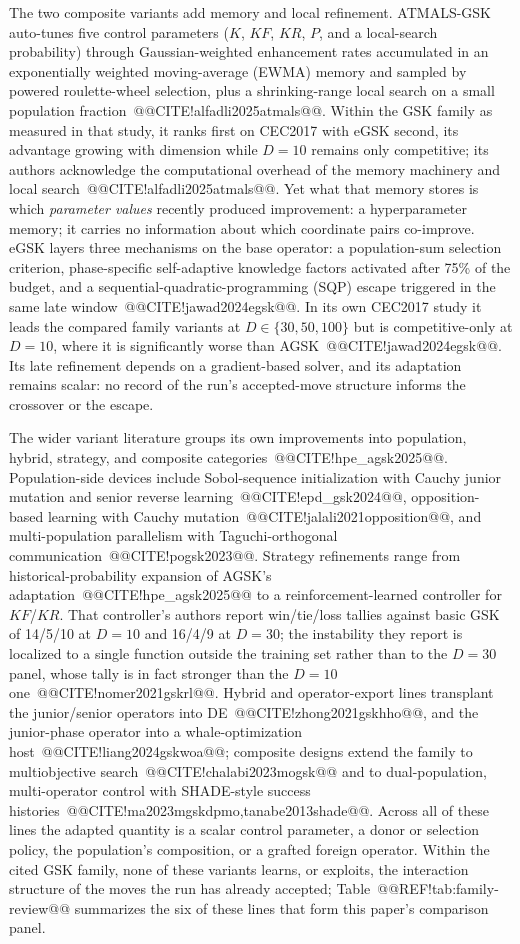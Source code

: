 \documentclass[10pt,a4paper]{article}
\newcommand{\atmals}{ATMALS-GSK}
\newcommand{\agsk}{AGSK}
\newcommand{\egsk}{eGSK}
\begin{document}
The two composite variants add memory and local refinement. \atmals{}
auto-tunes five control parameters ($K$, $KF$, $KR$, $P$, and a
local-search probability) through Gaussian-weighted enhancement rates
accumulated in an exponentially weighted moving-average (EWMA) memory and
sampled by powered roulette-wheel selection, plus a shrinking-range
local search on a small population
fraction~@@CITE!alfadli2025atmals@@. 
Within the GSK family as measured in that study, it ranks first on
CEC2017 with \egsk{} second, its advantage growing with dimension while
$D = 10$ remains only competitive; its authors acknowledge the
computational overhead of the memory machinery and local
search~@@CITE!alfadli2025atmals@@. 
Yet what that memory stores is which \emph{parameter values} recently
produced improvement: a hyperparameter memory; it carries no
information about which coordinate pairs co-improve. \egsk{} layers
three mechanisms on the base operator: a population-sum selection
criterion, phase-specific self-adaptive knowledge factors activated
after 75\% of the budget, and a sequential-quadratic-programming (SQP)
escape triggered in the same late
window~@@CITE!jawad2024egsk@@. 
In its own CEC2017 study it leads the compared family variants at
$D \in \{30, 50, 100\}$ but is competitive-only at $D = 10$, where it is
significantly worse than
\agsk{}~@@CITE!jawad2024egsk@@. 
Its late refinement depends on a gradient-based solver, and its
adaptation remains scalar: no record of the run's accepted-move
structure informs the crossover or the escape.

The wider variant literature groups its own improvements into
population, hybrid, strategy, and composite
categories~@@CITE!hpe\_agsk2025@@. Population-side devices include
Sobol-sequence initialization with Cauchy junior mutation and senior
reverse learning~@@CITE!epd\_gsk2024@@, opposition-based learning with
Cauchy mutation~@@CITE!jalali2021opposition@@, and multi-population
parallelism with Taguchi-orthogonal communication~@@CITE!pogsk2023@@.
Strategy refinements range from historical-probability expansion of
\agsk{}'s adaptation~@@CITE!hpe\_agsk2025@@ to a reinforcement-learned
controller for $KF$/$KR$. That controller's authors report win/tie/loss tallies
against basic GSK of 14/5/10 at $D = 10$ and 16/4/9 at $D = 30$; the instability
they report is localized to a single function outside the training set rather than
to the $D = 30$ panel, whose tally is in fact stronger than the $D = 10$
one~@@CITE!nomer2021gskrl@@. 
Hybrid and operator-export lines transplant the junior/senior operators
into DE~@@CITE!zhong2021gskhho@@, and the junior-phase operator into a
whale-optimization host~@@CITE!liang2024gskwoa@@; composite designs extend the family to
multiobjective search~@@CITE!chalabi2023mogsk@@ and to dual-population,
multi-operator control with SHADE-style success
histories~@@CITE!ma2023mgskdpmo,tanabe2013shade@@. Across all of these
lines the adapted quantity is a scalar control parameter, a donor or
selection policy, the population's composition, or a grafted foreign
operator. Within the cited GSK family, none of these variants learns,
or exploits, the interaction structure of the moves the run has
already accepted; Table~@@REF!tab:family-review@@ summarizes the six of these
lines that form this paper's comparison panel. 
\end{document}
